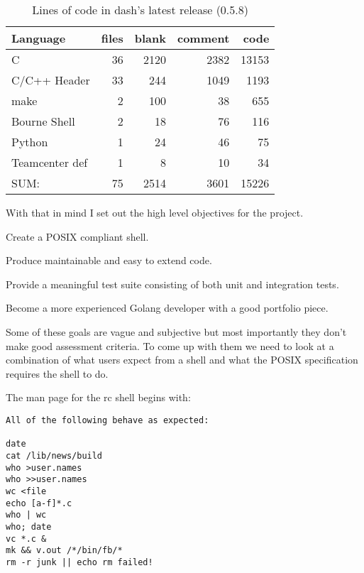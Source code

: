 \begin{table}[hp]
\centering
\caption{Lines of code in dash's latest release (0.5.8)}
\label{tab:dash-loc}
\begin{tabular}{@{}lrrrr@{}}
\toprule
Language       & files & blank & comment & code  \\ \midrule
C              & 36    & 2120  & 2382    & 13153 \\
C/C++ Header   & 33    & 244   & 1049    & 1193  \\
make           & 2     & 100   & 38      & 655   \\
Bourne Shell   & 2     & 18    & 76      & 116   \\
Python         & 1     & 24    & 46      & 75    \\
Teamcenter def & 1     & 8     & 10      & 34    \\ \midrule
SUM:           & 75    & 2514  & 3601    & 15226 \\ \bottomrule
\end{tabular}
\end{table}

With that in mind I set out the high level objectives for the project.

\begin{itemize*}
    \item Create a POSIX\cite{POSIX-SHELL-STANDARD} compliant shell.
    \item Produce maintainable and easy to extend code.
    \item Provide a meaningful test suite consisting of both unit and integration tests.
    \item Become a more experienced Golang developer with a good portfolio piece.
\end{itemize*}

Some of these goals are vague and subjective but most importantly they don't make good assessment criteria.
To come up with them we need to look at a combination of what users expect from a shell and what the POSIX specification requires the shell to do.

The man page for the rc shell begins with:
\begin{lstlisting}
All of the following behave as expected:

date
cat /lib/news/build
who >user.names
who >>user.names
wc <file
echo [a-f]*.c
who | wc
who; date
vc *.c &
mk && v.out /*/bin/fb/*
rm -r junk || echo rm failed!
\end{lstlisting}

